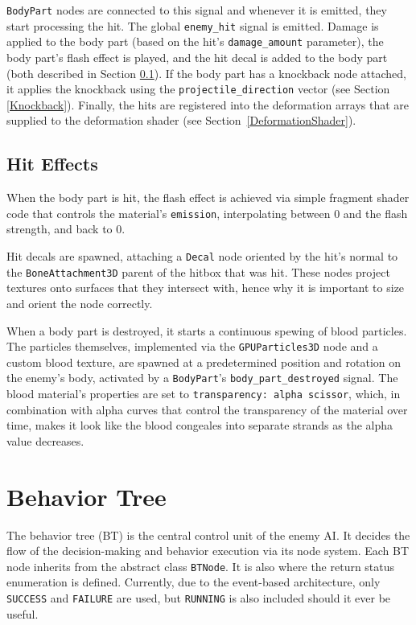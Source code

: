 \texttt{BodyPart} nodes are connected to this signal and whenever it is emitted, they start processing the hit. The global \texttt{enemy\_hit} signal is emitted. Damage is applied to the body part (based on the hit's \texttt{damage\_amount} parameter), the body part's flash effect is played, and the hit decal is added to the body part (both described in Section \ref{HitEffects}). If the body part has a knockback node attached, it applies the knockback using the \texttt{projectile\_direction} vector (see Section \ref{Knockback}). Finally, the hits are registered into the deformation arrays that are supplied to the deformation shader (see Section~\ref{DeformationShader}).

\subsection{Hit Effects}
\label{HitEffects}
When the body part is hit, the flash effect is achieved via simple fragment shader code that controls the material's \texttt{emission}, interpolating between $0$ and the flash strength, and back to $0$.

Hit decals are spawned, attaching a \texttt{Decal} node oriented by the hit's normal to the \texttt{BoneAttachment3D} parent of the hitbox that was hit. These nodes project textures onto surfaces that they intersect with, hence why it is important to size and orient the node correctly.

When a body part is destroyed, it starts a continuous spewing of blood particles. The particles themselves, implemented via the \texttt{GPUParticles3D} node and a custom blood texture, are spawned at a predetermined position and rotation on the enemy's body, activated by a \texttt{BodyPart}'s \texttt{body\_part\_destroyed} signal. The blood material's properties are set to \texttt{transparency: alpha scissor}, which, in combination with alpha curves that control the transparency of the material over time, makes it look like the blood congeales into separate strands as the alpha value decreases.


\section{Behavior Tree}
The behavior tree (BT) is the central control unit of the enemy AI. It decides the flow of the decision-making and behavior execution via its node system. Each BT node inherits from the abstract class \texttt{BTNode}.
It is also where the return status enumeration is defined. Currently, due to the event-based architecture, only \texttt{SUCCESS} and \texttt{FAILURE} are used, but \texttt{RUNNING} is also included should it ever be useful.

